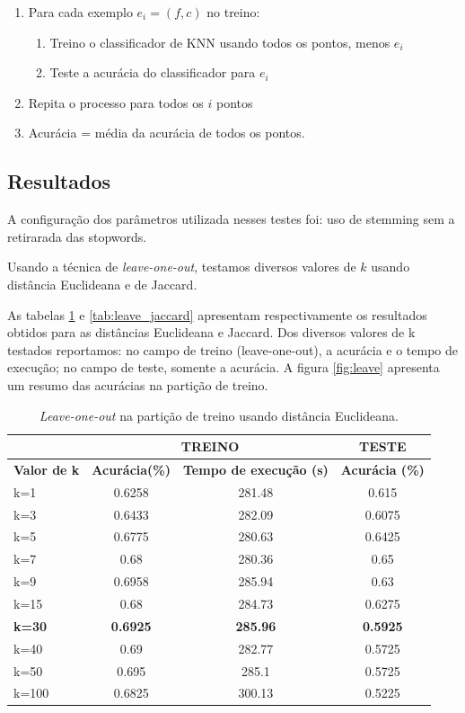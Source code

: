 \documentclass[a4paper, 11 pt, onecolumn]{article}   %
\begin{document}
\begin{enumerate}
 \item Para cada exemplo $e_i = (f, c)$ no treino:
 \begin{enumerate}
  \item Treino o classificador de KNN usando todos os pontos, menos $e_i$
  \item Teste a acurácia do classificador para $e_i$
 \end{enumerate}
  \item Repita o processo para todos os $i$ pontos
  \item Acurácia = média da acurácia de todos os pontos.
\end{enumerate}

\subsection{Resultados}

A configuração dos parâmetros utilizada nesses testes foi: uso de stemming sem a retirarada das stopwords.

Usando a técnica de \textit{leave-one-out}, testamos diversos valores de $k$ usando distância Euclideana e de Jaccard. 

As tabelas \ref{tab:leave} e \ref{tab:leave_jaccard} apresentam respectivamente os resultados obtidos para as distâncias  Euclideana e Jaccard. Dos diversos valores de k testados reportamos: no campo de treino (leave-one-out), a acurácia e o tempo de execução; no campo de teste, somente a acurácia. A figura \ref{fig:leave} apresenta um resumo das acurácias na partição de treino.

\begin{table}[htp!]
\centering
 \begin{tabular}{l|c c|c}
  \textbf{}& \multicolumn{2}{|c|}{\textbf{TREINO}} & \textbf{TESTE}\\ \hline
  \textbf{Valor de k} &\textbf{Acurácia(\%)}&\textbf{Tempo de execução (s)} & \textbf{Acurácia (\%)}\\ \hline
    k=1 & 0.6258  & 281.48  & 0.615 \\
    k=3 & 0.6433  & 282.09  & 0.6075\\
    k=5 & 0.6775  & 280.63  & 0.6425\\
    k=7 & 0.68  & 280.36  & 0.65\\
    k=9 & 0.6958  &285.94  & 0.63\\
    k=15 & 0.68  & 284.73  &  0.6275\\
    \textbf{k=30} & \textbf{0.6925}  & \textbf{285.96} & \textbf{0.5925 }\\
    k=40 &  0.69 & 282.77  & 0.5725\\
    k=50 &  0.695 & 285.1 & 0.5725 \\
    k=100 & 0.6825  & 300.13  &0.5225\\
 \end{tabular}
  \caption{\label{tab:leave} \textit{Leave-one-out} na partição de treino usando distância Euclideana.}
\end{table}
\end{document}
